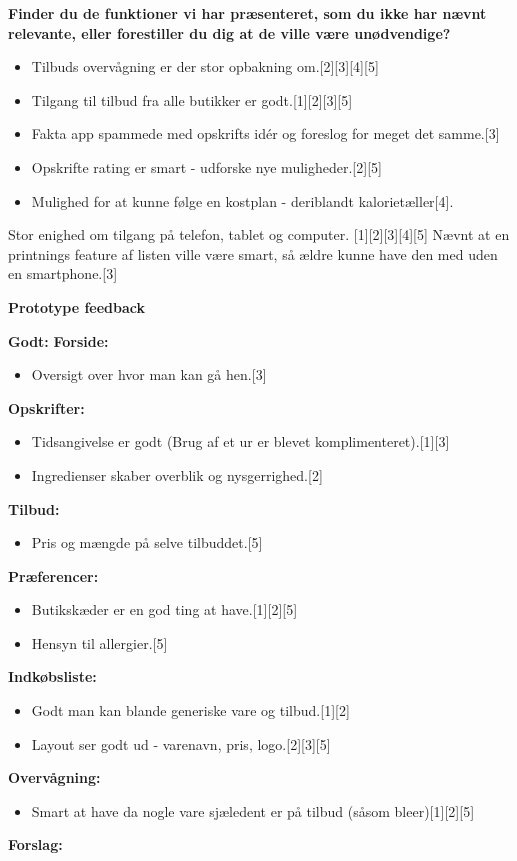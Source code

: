\textbf{Finder du de funktioner vi har præsenteret, som du ikke har nævnt relevante, eller forestiller du dig at de ville være unødvendige?}
\begin{itemize}
	\item Tilbuds overvågning er der stor opbakning om.{[}2{]}{[}3{]}{[}4{]}{[}5{]}
	\item Tilgang til tilbud fra alle butikker er godt.{[}1{]}{[}2{]}{[}3{]}{[}5{]}
	\item Fakta app spammede med opskrifts idér og foreslog for meget det samme.{[}3{]}
	\item Opskrifte rating er smart - udforske nye muligheder.{[}2{]}{[}5{]}
	\item Mulighed for at kunne følge en kostplan - deriblandt kalorietæller{[}4{]}.
\end{itemize}

Stor enighed om tilgang på telefon, tablet og computer. {[}1{]}{[}2{]}{[}3{]}{[}4{]}{[}5{]}
Nævnt at en printnings feature af listen ville være smart, så ældre kunne have den med uden en smartphone.{[}3{]}

\textbf{Prototype feedback}

\textbf{Godt:}
		\textbf{Forside:}
	\begin{itemize}
		\item Oversigt over hvor man kan gå hen.{[}3{]}
	\end{itemize}

		\textbf{Opskrifter:}
	\begin{itemize}
		\item Tidsangivelse er godt (Brug af et ur er blevet komplimenteret).{[}1{]}{[}3{]}
		\item Ingredienser skaber overblik og nysgerrighed.{[}2{]}
	\end{itemize}
		\textbf{Tilbud:}
	\begin{itemize}
		\item Pris og mængde på selve tilbuddet.{[}5{]}
	\end{itemize}
		\textbf{Præferencer:}
	\begin{itemize}
		\item Butikskæder er en god ting at have.{[}1{]}{[}2{]}{[}5{]}
		\item Hensyn til allergier.{[}5{]}
	\end{itemize}
		\textbf{Indkøbsliste:}
	\begin{itemize}
		\item Godt man kan blande generiske vare og tilbud.{[}1{]}{[}2{]}
		\item Layout ser godt ud - varenavn, pris, logo.{[}2{]}{[}3{]}{[}5{]}
	\end{itemize}
		\textbf{Overvågning:}
	\begin{itemize}
		\item Smart at have da nogle vare sjæledent er på tilbud (såsom bleer){[}1{]}{[}2{]}{[}5{]}
	\end{itemize}
\textbf{Forslag:}

